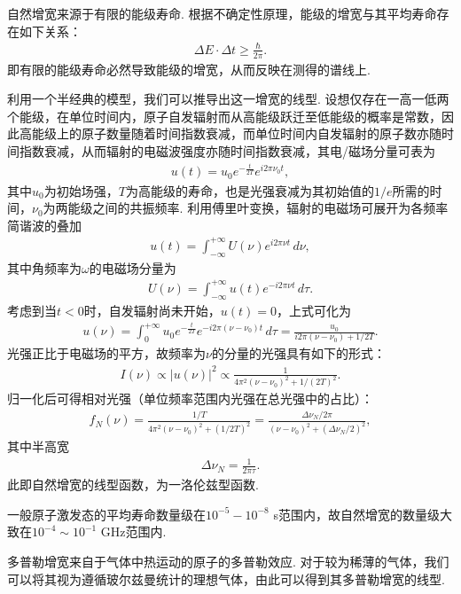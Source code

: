 \documentclass[a4paper, 10pt]{article}
\providecommand{\abs}[1]{\left\lvert#1\right\rvert} %
\newcounter{subsubsubsection}[subsubsection]
\begin{document}
\begin{multicols*}{2}
自然增宽来源于有限的能级寿命. 根据不确定性原理，能级的增宽与其平均寿命存在如下关系：
\begin{align}
    \Delta E\cdot\Delta t\geq\frac{\hbar}{2\pi}.
\end{align}
即有限的能级寿命必然导致能级的增宽，从而反映在测得的谱线上.

利用一个半经典的模型，我们可以推导出这一增宽的线型. 设想仅存在一高一低两个能级，在单位时间内，原子自发辐射而从高能级跃迁至低能级的概率是常数，因此高能级上的原子数量随着时间指数衰减，而单位时间内自发辐射的原子数亦随时间指数衰减，从而辐射的电磁波强度亦随时间指数衰减，其电/磁场分量可表为
\begin{align}
    u(t)=u_0e^{-\frac{t}{2T}}e^{i2\pi\nu_0t},
\end{align}
其中$u_0$为初始场强，$T$为高能级的寿命，也是光强衰减为其初始值的$1/e$所需的时间，$\nu_0$为两能级之间的共振频率.
利用傅里叶变换，辐射的电磁场可展开为各频率简谐波的叠加
\begin{align}
    u(t)=\int_{-\infty}^{+\infty}U(\nu)e^{i2\pi\nu t}\,d\nu,
\end{align}
其中角频率为$\omega$的电磁场分量为
\begin{align}
    U(\nu)=\int_{-\infty}^{+\infty}u(t)e^{-i2\pi\nu t}\,d\tau.
\end{align}
考虑到当$t<0$时，自发辐射尚未开始，$u(t)=0$，上式可化为
\begin{align}
    u(\nu)=\int_0^{+\infty}u_0e^{-\frac{t}{2T}}e^{-i2\pi(\nu-\nu_0)t}\,d\tau=\frac{u_0}{i2\pi(\nu-\nu_0)+1/2T}.
\end{align}
光强正比于电磁场的平方，故频率为$\nu$的分量的光强具有如下的形式：
\begin{align}
    I(\nu)\propto\abs{u(\nu)}^2\propto\frac{1}{4\pi^2(\nu-\nu_0)^2+1/(2T)^2}.
\end{align}
归一化后可得相对光强（单位频率范围内光强在总光强中的占比）：
\begin{align}
    f_N(\nu)=\frac{1/T}{4\pi^2(\nu-\nu_0)^2+(1/2T)^2}=\frac{\Delta\nu_N/2\pi}{(\nu-\nu_0)^2+(\Delta\nu_N/2)^2},
\end{align}
其中半高宽
\begin{align}
    \label{nature-width}
    \Delta\nu_N=\frac{1}{2\pi\tau}.
\end{align}
此即自然增宽的线型函数，为一洛伦兹型函数.

一般原子激发态的平均寿命数量级在$10^{-5}-10^{-8}$ s范围内，故自然增宽的数量级大致在$10^{-4}\sim 10^{-1}$ GHz范围内.

多普勒增宽来自于气体中热运动的原子的多普勒效应. 对于较为稀薄的气体，我们可以将其视为遵循玻尔兹曼统计的理想气体，由此可以得到其多普勒增宽的线型.


\end{multicols*}
\end{document}

